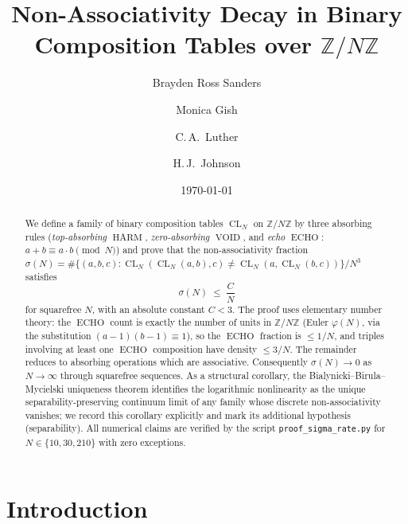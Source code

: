 \documentclass[11pt,reqno]{amsart}
\title[Non-associativity decay on \texorpdfstring{$\mathbb{Z}/N\mathbb{Z}$}{Z/NZ}]%
{Non-Associativity Decay in Binary Composition Tables over
$\mathbb{Z}/N\mathbb{Z}$}
\author{Brayden Ross Sanders}
\author{Monica Gish}
\author{C.\,A.~Luther}
\author{H.\,J.~Johnson}
\date{\today}
\theoremstyle{plain}
\theoremstyle{definition}
\theoremstyle{remark}
\DeclareMathOperator{\CL}{CL}
\DeclareMathOperator{\ECHO}{ECHO}
\DeclareMathOperator{\HARM}{HARM}
\DeclareMathOperator{\VOID}{VOID}
\newcommand{\ZN}{\mathbb{Z}/N\mathbb{Z}}
\begin{document}
\begin{abstract}
We define a family of binary composition tables $\CL_N$ on $\ZN$ by
three absorbing rules (\emph{top-absorbing} $\HARM$, \emph{zero-absorbing}
$\VOID$, and \emph{echo} $\ECHO$: $a+b\equiv a\cdot b\pmod N$) and
prove that the non-associativity fraction
$\sigma(N)=\#\{(a,b,c):\CL_N(\CL_N(a,b),c)\neq\CL_N(a,\CL_N(b,c))\}/N^3$
satisfies
\[
  \sigma(N)\;\le\;\frac{C}{N}
\]
for squarefree $N$, with an absolute constant $C<3$. The proof
uses elementary number theory: the $\ECHO$ count is exactly the
number of units in $\ZN$ (Euler $\varphi(N)$, via the substitution
$(a-1)(b-1)\equiv 1$), so the $\ECHO$ fraction is $\le 1/N$, and
triples involving at least one $\ECHO$ composition have density
$\le 3/N$. The remainder reduces to absorbing operations which are
associative. Consequently $\sigma(N)\to 0$ as $N\to\infty$ through
squarefree sequences. As a structural corollary, the
Bialynicki--Birula--Mycielski uniqueness theorem \cite{BB1976}
identifies the logarithmic nonlinearity as the unique
separability-preserving continuum limit of any family whose discrete
non-associativity vanishes; we record this corollary explicitly and
mark its additional hypothesis (separability). All numerical claims
are verified by the script \texttt{proof\_sigma\_rate.py} for
$N\in\{10,30,210\}$ with zero exceptions.
\end{abstract}

\maketitle

\section{Introduction}\label{sec:intro}
\end{document}
